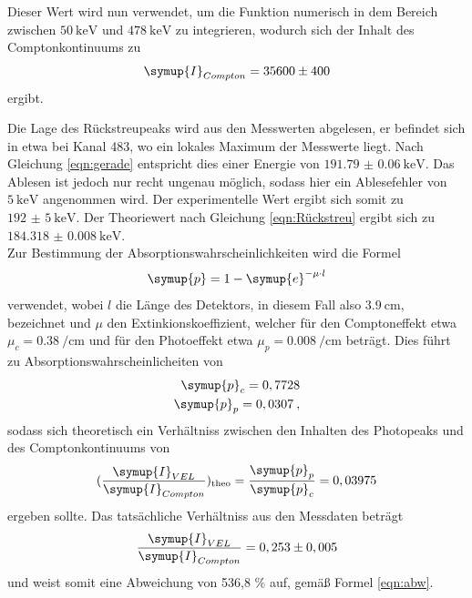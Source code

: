 Dieser Wert wird nun verwendet, um die Funktion numerisch in dem Bereich zwischen $\SI{50}{\kilo\electronvolt}$
und $\SI{478}{\kilo\electronvolt}$
zu integrieren, wodurch sich der Inhalt des Comptonkontinuums zu
\begin{align*}
  \symup{I}_{Compton} =  35600 \pm 400
\end{align*}
ergibt.

Die Lage des Rückstreupeaks wird aus den Messwerten abgelesen, er befindet sich in etwa bei
Kanal 483, wo ein lokales Maximum der Messwerte liegt. Nach Gleichung \ref{eqn:gerade}
entspricht dies einer Energie von $\SI{191.79(6)}{\kilo\electronvolt}$. Das Ablesen
ist jedoch nur recht ungenau möglich, sodass hier ein Ablesefehler von $\SI{5}{\kilo\electronvolt}$
angenommen wird. Der experimentelle Wert ergibt sich somit zu $\SI{192(5)}{\kilo\electronvolt}$.
Der Theoriewert nach Gleichung \ref{eqn:Rückstreu} ergibt sich zu $\SI{184.318(8)}{\kilo\electronvolt}$.
\\
Zur Bestimmung der Absorptionswahrscheinlichkeiten wird die Formel
\begin{equation}
  \symup{p} = 1-\symup{e}^{-\mu \cdot l}
\end{equation}
verwendet, wobei $l$ die Länge des Detektors, in diesem Fall also $\SI{3.9}{\centi\meter}$, bezeichnet
und $\mu$ den Extinkionskoeffizient, welcher für den Comptoneffekt etwa
$\mu_{c}=\SI{0.38}{\per\centi\meter}$ und für den Photoeffekt etwa
$\mu_{p}=\SI{0.008}{\per\centi\meter}$ beträgt.
Dies führt zu Absorptionswahrscheinlicheiten von
\begin{align*}
  \symup{p}_{c} = 0,7728 \\
  \symup{p}_{p} = 0,0307 \: ,
\end{align*}
sodass sich theoretisch ein Verhältniss zwischen den Inhalten des Photopeaks und des
Comptonkontinuums von
\begin{equation*}
  (\frac{\symup{I}_{VEL}}{\symup{I}_{Compton}})_{\text{theo}} = \frac{\symup{p}_{p}}{\symup{p}_{c}}
  = 0,03975
\end{equation*}
ergeben sollte. Das tatsächliche Verhältniss aus den Messdaten beträgt
\begin{equation*}
  \frac{\symup{I}_{VEL}}{\symup{I}_{Compton}}
  = 0,253 \pm 0,005
\end{equation*}
und weist somit eine Abweichung von 536,8 \% auf, gemäß Formel \ref{eqn:abw}.


